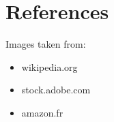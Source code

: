 \documentclass{article}
\begin{document}

\section*{References}
Images taken from: 
\begin{itemize}
	\item wikipedia.org
	\item stock.adobe.com
	\item amazon.fr
\end{itemize}


\end{document}
